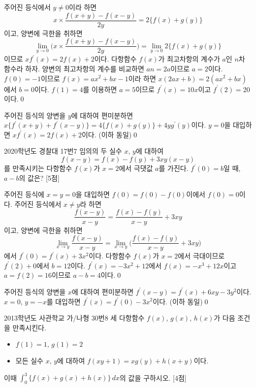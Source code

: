 \documentclass{article}
\begin{document}
\begin{sol}[정석 풀이]
	주어진 등식에서 $y\ne0$이라 하면
	\[
		x\times\frac{f(x+y)-f(x-y)}{2y}=2\{f(x)+g(y)\}
	\]
	이고, 양변에 극한을 취하면
	\[
		\lim\limits_{y\to0}\biggl(x\times\frac{f(x+y)-f(x-y)}{2y}\biggr)=\lim\limits_{y\to0}2\{f(x)+g(y)\}
	\]
	이므로 $xf^\prime(x)=2f(x)+2$이다. 다항함수 $f(x)$가 최고차항의 계수가 $a$인 $n$차 함수라 하자. 양변의 최고차항의 계수를 비교하면 $an=2a$이므로 $a=2$이다. $f(0)=-1$이므로 $f(x)=ax^2+bx-1$이라 하면 $x(2ax+b)=2(ax^2+bx)$에서 $b=0$이다. $f(1)=4$를 이용하면 $a=5$이므로 $f^\prime(x)=10x$이고 $f^\prime(2)=20$이다.\qed
\end{sol}

\begin{sol}[편미분 풀이]
	주어진 등식의 양변을 $y$에 대하여 편미분하면 $x\{f^\prime(x+y)+f^\prime(x-y)\}=4\{f(x)+g(y)\}+4yg^\prime(y)$이다. $y=0$을 대입하면 $xf^\prime(x)=2f(x)+2$이다. (이하 동일)\qed
\end{sol}

\newpage
\begin{prob}{2020학년도 경찰대 17번}{7}
	임의의 두 실수 $x$, $y$에 대하여
	\[
		f(x-y)=f(x)-f(y)+3xy(x-y)
	\]
	를 만족시키는 다항함수 $f(x)$가 $x=2$에서 극댓값 $a$를 가진다. $f^\prime(0)=b$일 때, $a-b$의 값은? [5점]
\end{prob}

\begin{sol}[정석 풀이]
	주어진 등식에 $x=y=0$을 대입하면 $f(0)=f(0)-f(0)$이에서 $f(0)=0$이다. 주어진 등식에서 $x\ne y$라 하면
	\[
		\frac{f(x-y)}{x-y}=\frac{f(x)-f(y)}{x-y}+3xy
	\]
	이고, 양변에 극한을 취하면
	\[
		\lim\limits_{x\to y}\frac{f(x-y)}{x-y}=\lim\limits_{x\to y}\biggl(\frac{f(x)-f(y)}{x-y}+3xy\biggr)
	\]
	에서 $f^\prime(0)=f^\prime(x)+3x^2$이다. 다항함수 $f(x)$가 $x=2$에서 극대이므로 $f^\prime(2)+0$에서 $b=12$이다. $f^\prime(x)=-3x^2+12$에서 $f(x)=-x^3+12x$이고 $a=f(2)=16$이므로 $a-b=4$이다.\qed
\end{sol}

\begin{sol}[편미분 풀이]
	주어진 등식의 양변을 $x$에 대하여 편미분하면 $f^\prime(x-y)=f^\prime(x)+6xy-3y^2$이다. $x=0$, $y=-x$를 대입하면 $f^\prime(x)=f^\prime(0)-3x^2$이다. (이하 동일)\qed
\end{sol}

\newpage
\begin{prob}{2013학년도 사관학교 가/나형 30번}{8}
	세 다항함수 $f(x)$, $g(x)$, $h(x)$가 다음 조건을 만족시킨다.
	\begin{hint}
		\begin{itemize}
			\item[(가)] $f(1)=1$, $g(1)=2$
			\item[(나)] 모든 실수 $x$, $y$에 대하여 $f(xy+1)=xg(y)+h(x+y)$이다.
		\end{itemize}
	\end{hint}
	이때 $\displaystyle\int_0^3\{f(x)+g(x)+h(x)\}\,dx$의 값을 구하시오. [4점]
\end{prob}
\end{document}
